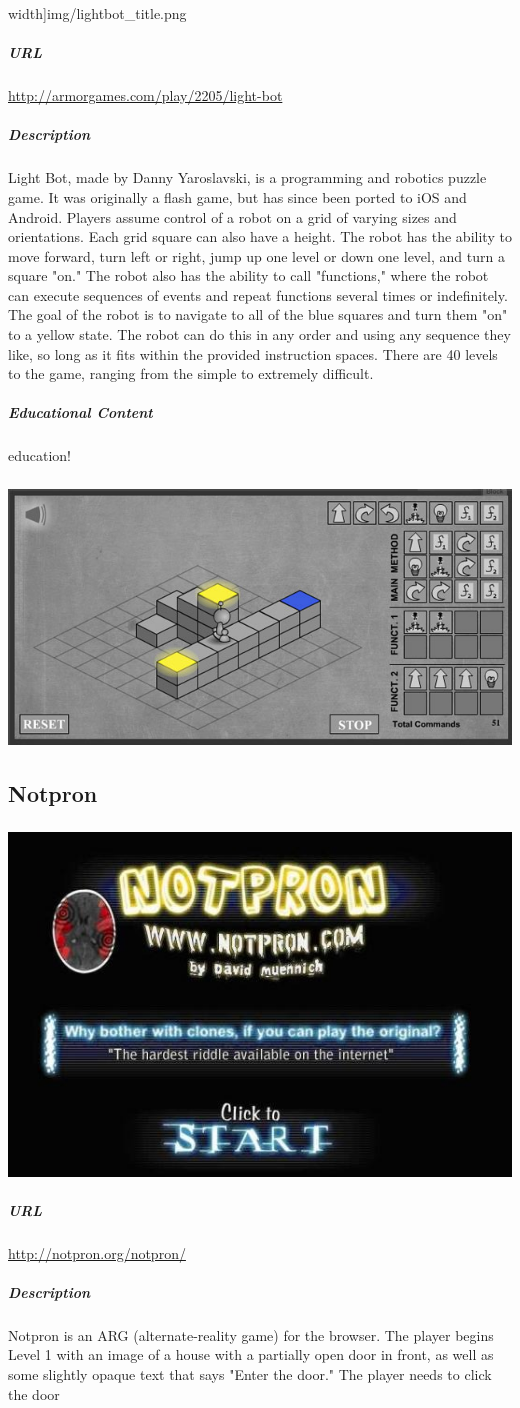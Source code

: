 width]{img/lightbot_title.png}\subparagraph{URL}\url{http://armorgames.com/play/2205/light-bot}\subparagraph{Description}Light Bot, made by Danny Yaroslavski, is a programming and robotics puzzle game. It was originally a flash game, but has since been ported to iOS and Android. Players assume control of a robot on a grid of varying sizes and orientations. Each grid square can also have a height. The robot has the ability to move forward, turn left or right, jump up one level or down one level, and turn a square "on." The robot also has the ability to call "functions," where the robot can execute sequences of events and repeat functions several times or indefinitely. The goal of the robot is to navigate to all of the blue squares and turn them "on" to a yellow state. The robot can do this in any order and using any sequence they like, so long as it fits within the provided instruction spaces. There are 40 levels to the game, ranging from the simple to extremely difficult.\subparagraph{Educational Content}education!\subparagraph{}\includegraphics[width = \textwidth]{img/lightbot_screen.jpg}\newpage\subsection{Notpron}\subparagraph{}\includegraphics[width = \textwidth]{img/notpron_title.jpeg}\subparagraph{URL}\url{http://notpron.org/notpron/}\subparagraph{Description}Notpron is an ARG (alternate-reality game) for the browser. The player begins Level 1 with an image of a house with a partially open door in front, as well as some slightly opaque text that says "Enter the door." The player needs to click the door 